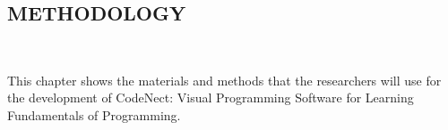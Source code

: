 \begin{doublespace}
	\begin{center}
		\section{\textbf{METHODOLOGY}}
	\end{center}

	\leavevmode\\
	\par
	\justifying
	This chapter shows the materials and methods that the researchers will use
	for the development of CodeNect: Visual Programming Software for Learning
	Fundamentals of Programming.

	
	

\end{doublespace}
